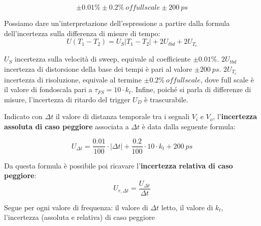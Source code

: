\[\pm0.01\% \pm0.2\% \ of full scale \pm 200 \ ps\]

Possiamo dare un'interpretazione dell'espressione a partire dalla formula dell'incertezza sulla differenza di misure di tempo:
\[U(T_1 - T_2) = U_S |T_1 - T_2| + 2U_{tbd} + 2U_{T_c}\]

$U_S$ incertezza sulla velocità di sweep, equivale al coefficiente $\pm0.01\%$.
$2U_{tbd}$ incertezza di distorsione della base dei tempi è pari al valore $\pm200 \ ps$.
$2U_{T_c}$ incertezza di risoluzione, equivale al termine $\pm0.2\% \ of full scale$, dove full scale è il valore di fondoscala pari a $\tau _{FS}  = 10 \cdot k_t$.
Infine, poiché si parla di differenze di misure, l'incertezza di ritardo del trigger $U_D$ è trascurabile.

Indicato con $\Delta t$ il valore di distanza temporale tra i segnali $V_i$ e $V_o$, l'\textbf{incertezza assoluta di caso peggiore} associata a $\Delta t$ è data dalla seguente formula:

\[U_{\Delta t} = \frac{0.01}{100} \cdot |\Delta t| + \frac{0.2}{100} \cdot  10 \cdot k_t + 200 \ ps  \]

Da questa formula è possibile poi ricavare l'\textbf{incertezza relativa di caso peggiore}:
\[U_{r,\Delta t} = \frac{U_{\Delta t}}{\Delta t}\]

Segue per ogni valore di frequenza: il valore di $\Delta t$ letto, il valore di $k_t$, l'incertezza (assoluta e relativa) di caso peggiore

